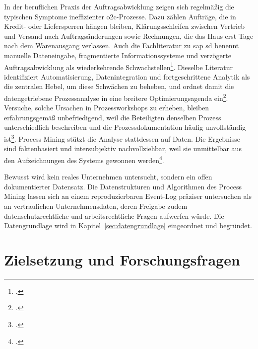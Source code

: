 In der beruflichen Praxis der Auftragsabwicklung zeigen sich regelmäßig die typischen Symptome ineffizienter \gls{o2c}-Prozesse. Dazu zählen Aufträge, die in Kredit- oder Liefersperren hängen bleiben, Klärungsschleifen zwischen Vertrieb und Versand nach Auftragsänderungen sowie Rechnungen, die das Haus erst Tage nach dem Warenausgang verlassen. Auch die Fachliteratur zu \gls{sap} \gls{sd} benennt manuelle Dateneingabe, fragmentierte Informationssysteme und verzögerte Auftragsabwicklung als wiederkehrende Schwachstellen\footcite[Vgl.][S.~109 f.]{nadukuru2024o2c}. Dieselbe Literatur identifiziert Automatisierung, Datenintegration und fortgeschrittene Analytik als die zentralen Hebel, um diese Schwächen zu beheben, und ordnet damit die datengetriebene Prozessanalyse in eine breitere Optimierungsagenda ein\footcite[Vgl.][S.~110 ff.]{nadukuru2024o2c}. Versuche, solche Ursachen in Prozessworkshops zu erheben, bleiben erfahrungsgemäß unbefriedigend, weil die Beteiligten denselben Prozess unterschiedlich beschreiben und die Prozessdokumentation häufig unvollständig ist\footcite[Vgl.][S.~50 und 62]{adolfsson2026o2c}. Process Mining stützt die Analyse stattdessen auf Daten. Die Ergebnisse sind faktenbasiert und intersubjektiv nachvollziehbar, weil sie unmittelbar aus den Aufzeichnungen des Systems gewonnen werden\footcite[Vgl.][S.~169 ff.]{vanderaalst2012manifesto}.

Bewusst wird kein reales Unternehmen untersucht, sondern ein offen dokumentierter Datensatz. Die Datenstrukturen und Algorithmen des Process Mining lassen sich an einem reproduzierbaren Event-Log präziser untersuchen als an vertraulichen Unternehmensdaten, deren Freigabe zudem datenschutzrechtliche und arbeitsrechtliche Fragen aufwerfen würde. Die Datengrundlage wird in Kapitel~\ref{sec:datengrundlage} eingeordnet und begründet.

\section{Zielsetzung und Forschungsfragen}\label{sec:zielsetzung}

